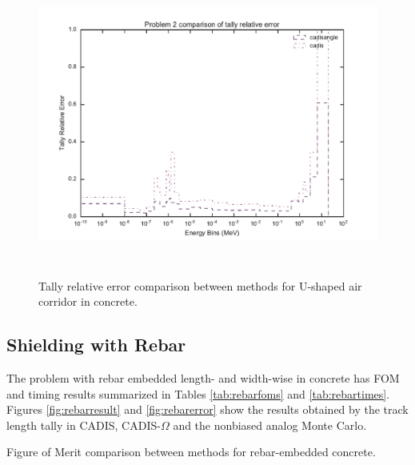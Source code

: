 \begin{figure}[h!]
  \centering
  \includegraphics[height=10cm]{./chapters/characterization_probs/figures/char/prob_2/problem_2_tally_error_compare.pdf}
  \caption[Tally relative error comparison between methods for U-shaped air
  corridor in concrete.]
  {Tally relative error comparison between methods for U-shaped air corridor in
  concrete.}
  \label{fig:ucorridorerror}
\end{figure}
%
%
%

\subsection{Shielding with Rebar}
\label{subsec:resultrebar}

The problem with rebar embedded length- and width-wise
in concrete has FOM and timing
results summarized in Tables
\ref{tab:rebarfoms} and \ref{tab:rebartimes}. Figures
\ref{fig:rebarresult} and \ref{fig:rebarerror} show the results obtained
by the track length tally in CADIS, CADIS-$\Omega$ and the nonbiased analog
Monte Carlo.

\begin{table}[h!]
  \centering
  
  \caption[Figure of Merit comparison between methods for rebar-embedded
  concrete.]{Figure of Merit comparison between methods for rebar-embedded
  concrete.}
  \label{tab:rebarfoms}
\end{table}

